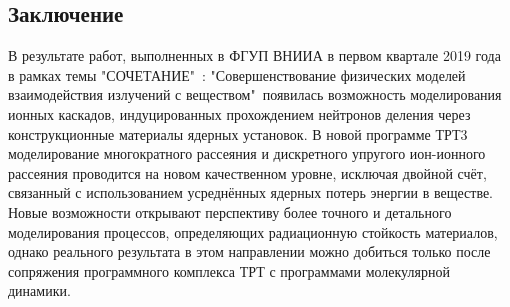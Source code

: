 \documentclass[a4paper,12pt]{article}
\begin{document}
\begin{large}
\clearpage
\section{Заключение}
\label{Conclusion}
  В результате работ, выполненных в ФГУП ВНИИА в первом квартале 2019 года в рамках темы "СОЧЕТАНИЕ"\ : "Совершенствование физических моделей взаимодействия излучений с веществом"\ появилась возможность моделирования ионных каскадов, индуцированных прохождением нейтронов деления через конструкционные материалы ядерных установок.
  В новой программе ТРТ3 моделирование многократного рассеяния и дискретного упругого ион-ионного рассеяния проводится на новом качественном уровне, исключая двойной счёт, связанный с использованием усреднённых ядерных потерь энергии в веществе.
  Новые возможности открывают перспективу более точного и детального моделирования процессов, определяющих радиационную стойкость материалов, однако реального результата в этом направлении можно добиться только после сопряжения программного комплекса ТРТ с программами молекулярной динамики.
  
\clearpage



\end{large}
\end{document}
